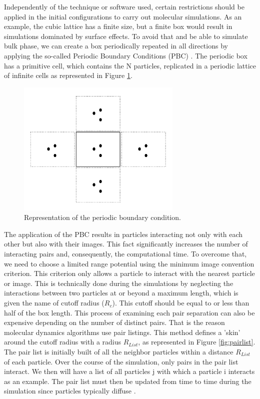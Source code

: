 Independently of the technique or software used, certain restrictions should be applied in the initial configurations to carry out molecular simulations. As an example, the cubic lattice has a finite size, but a finite box would result in simulations dominated by surface effects. To avoid that and be able to simulate bulk phase, we can create a box periodically repeated in all directions by applying the so-called Periodic Boundary Conditions (PBC) \cite{frenkel}. The periodic box has a primitive cell, which contains the N particles, replicated in a periodic lattice of infinite cells as represented in Figure \ref{fig:pbc}. 

\begin{figure}
	\centering
	\includegraphics[width=0.7\textwidth]{Figures/pbc}
	\caption{Representation of the periodic boundary condition.}
	\label{fig:pbc}
\end{figure}

The application of the PBC results in particles interacting not only with each other but also with their images. This fact significantly increases the number of interacting pairs and, consequently, the computational time. To overcome that, we need to choose a limited range potential using the minimum image convention criterion. This criterion only allows a particle to interact with the nearest particle or image.  This is technically done during the simulations by neglecting the interactions between two particles at or beyond a maximum length, which is given the name of cutoff radius ($R_{c}$). This cutoff should be equal to or less than half of the box length. This process of examining each pair separation can also be expensive depending on the number of distinct pairs. That is the reason molecular dynamics algorithms use pair listings. This method defines a 'skin' around the cutoff radius with a radius $R_{List}$, as represented in Figure \ref{fig:pairlist}. The pair list is initially built of all the neighbor particles within a distance $R_{List}$ of each particle. Over the course of the simulation, only pairs in the pair list interact. We then will have a list of all particles j with which a particle i interacts as an example. The pair list must then be updated from time to time during the simulation since particles typically diffuse \cite{tuckerman}.    

